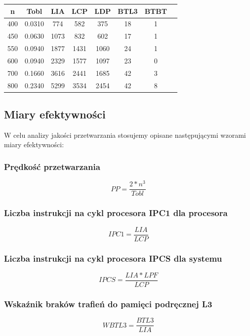 \documentclass[10pt,a4paper]{article}
\begin{document}
\begin{center}
    \begin{tabular}{ |c|c|c|c|c|c|c|c| }
        \hline
        n & Tobl & LIA & LCP & LDP & BTL3 & BTBT \\
        \hline
        400	& 0.0310 & 774 & 582 & 375 & 18 & 1\\
        \hline
        450	& 0.0630 & 1073 & 832 &	602 & 17 & 1\\
        \hline
        550	& 0.0940 & 1877 & 1431 & 1060 & 24 & 1\\
        \hline
        600	& 0.0940 & 2329 & 1577 & 1097 &	23 & 0\\
        \hline
        700	 & 0.1660 &	3616 & 2441 & 1685 & 42 & 3\\
        \hline
        800	& 0.2340 & 5299 & 3534 & 2454 &	42 & 8\\
        \hline
    \end{tabular}
\end{center}

\subsection{Miary efektywności}
W celu analizy jakości przetwarzania stosujemy opisane następującymi
wzorami miary efektywności:\\
\subsubsection*{Prędkość przetwarzania}
\begin{equation}
    PP = \frac{2 * n^3}{Tobl}
\end{equation}
\subsubsection*{Liczba instrukcji na cykl procesora IPC1 dla procesora}
\begin{equation}
    IPC1 = \frac{LIA}{LCP}
\end{equation}
\subsubsection*{Liczba instrukcji na cykl procesora IPCS dla systemu}
\begin{equation}
    IPCS = \frac{LIA*LPF}{LCP}
\end{equation}
\subsubsection*{Wskaźnik braków trafień do pamięci podręcznej L3}
\begin{equation}
    WBTL3 = \frac{BTL3}{LIA}
\end{equation}
\end{document}
